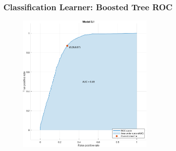 \documentclass{beamer}
\begin{document}
\begin{frame}
    \frametitle{Classification Learner: Boosted Tree ROC}
    \begin{figure}
    	\centering
    	\includegraphics[width=0.6\textwidth]{cl_1_roc}
    \end{figure}
\end{frame}
\end{document}
